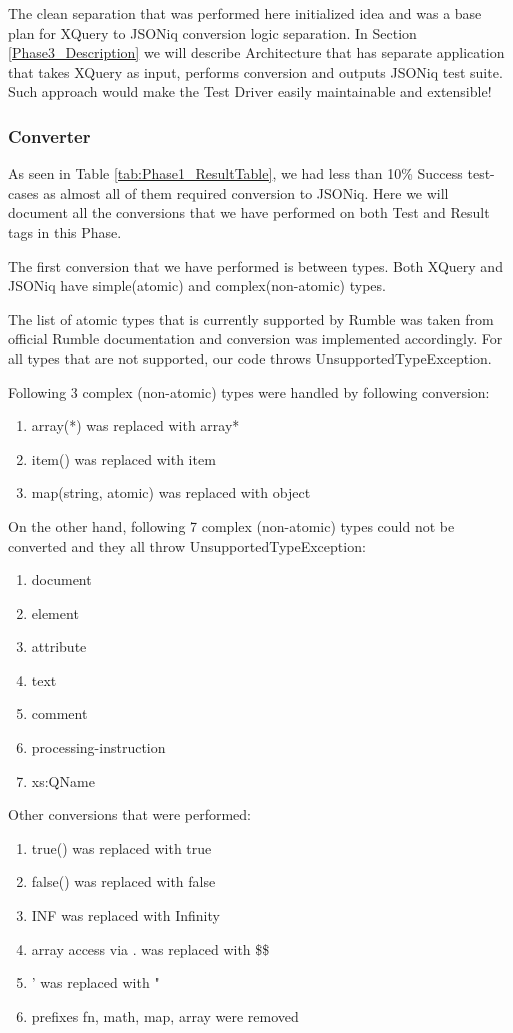 The clean separation that was performed here initialized idea and was a base plan for XQuery to JSONiq conversion logic separation. In Section \ref{Phase3_Description} we will describe Architecture that has separate application that takes XQuery as input, performs conversion and outputs JSONiq test suite. Such approach would make the Test Driver easily maintainable and extensible!

\subsubsection{Converter}
\label{Phase2_Converter}
As seen in Table \ref{tab:Phase1_ResultTable}, we had less than 10\% Success test-cases as almost all of them required conversion to JSONiq. Here we will document all the conversions that we have performed on both Test and Result tags in this Phase. 

The first conversion that we have performed is between types. Both XQuery and JSONiq have simple(atomic) and complex(non-atomic) types. 

The list of atomic types that is currently supported by Rumble was taken from official Rumble documentation \cite{RumbleSupportedTypes} and conversion was implemented accordingly. For all types that are not supported, our code throws UnsupportedTypeException. 

Following 3 complex (non-atomic) types were handled by following conversion:
\begin{enumerate}
	\item array(*) was replaced with array*
	\item item() was replaced with item
	\item map(string, atomic) was replaced with object 
\end{enumerate}

On the other hand, following 7 complex (non-atomic) types could not be converted and they all throw UnsupportedTypeException:
\begin{enumerate}
	\item document
	\item element
	\item attribute
	\item text
	\item comment
	\item processing-instruction
	\item xs:QName
\end{enumerate}

Other conversions that were performed:
\begin{enumerate}
	\item true() was replaced with true
	\item false() was replaced with false
	\item INF was replaced with Infinity
	\item array access via . was replaced with \$\$
	\item ' was replaced with "
	\item prefixes fn, math, map, array were removed
\end{enumerate}

